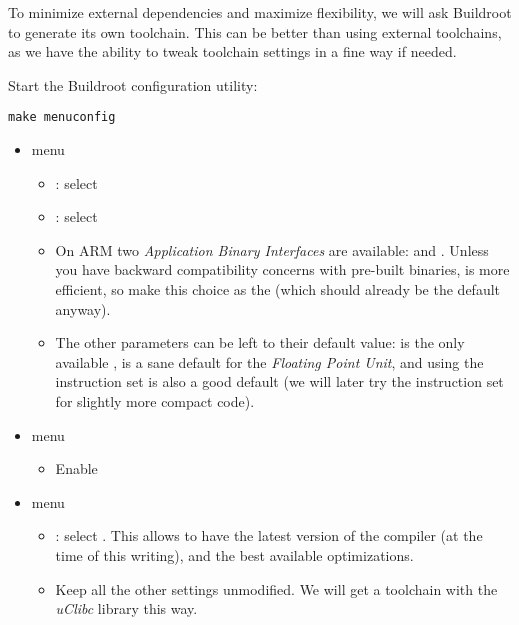 To minimize external dependencies and maximize flexibility, we will ask
Buildroot to generate its own toolchain. This can be better than using
external toolchains, as we have the ability to tweak toolchain settings
in a fine way if needed.

Start the Buildroot configuration utility:

\begin{verbatim}
make menuconfig
\end{verbatim}

\begin{itemize}

\item {} menu
  \begin{itemize}

  \item {}: select 

  \item {}: select 

  \item On ARM two {\em Application Binary Interfaces} are available:
     and . Unless you have backward
    compatibility concerns with pre-built binaries,  is
    more efficient, so make this choice as the 
    (which should already be the default anyway).

  \item The other parameters can be left to their default value:
     is the only available ,
     is a sane default for the {\em Floating Point
      Unit}, and using the  instruction set is also a good
    default (we will later try the  instruction set for
    slightly more compact code).
  \end{itemize}

\item {} menu
  \begin{itemize}
  \item Enable 
  \end{itemize}

\item {} menu
  \begin{itemize}
  \item {}: select . This allows
        to have the latest version of the compiler (at the time of this
	writing), and the best available optimizations.
  \item Keep all the other settings unmodified. We will get
	a toolchain with the {\em uClibc} library this way.
  \end{itemize}


\end{itemize}
